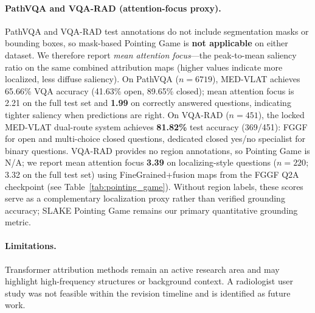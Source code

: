 \paragraph{PathVQA and VQA-RAD (attention-focus proxy).}
PathVQA and VQA-RAD test annotations do not include segmentation masks or
bounding boxes, so mask-based Pointing Game is \textbf{not applicable} on either
dataset.
We therefore report \emph{mean attention focus}---the peak-to-mean saliency
ratio on the same combined attribution maps (higher values indicate more
localized, less diffuse saliency).
On PathVQA ($n{=}6719$), MED-VLAT achieves 65.66\% VQA accuracy (41.63\%
open, 89.65\% closed); mean attention focus is 2.21 on the full test set and
\textbf{1.99} on correctly answered questions, indicating tighter saliency when
predictions are right.
On VQA-RAD ($n{=}451$), the locked MED-VLAT dual-route system achieves
\textbf{81.82\%} test accuracy (369/451): FGGF for open and multi-choice
closed questions, dedicated closed yes/no specialist for binary questions.
VQA-RAD provides no region annotations, so Pointing Game is N/A; we report
mean attention focus \textbf{3.39} on localizing-style questions ($n{=}220$;
3.32 on the full test set) using FineGrained+fusion maps from the FGGF Q2A
checkpoint (see Table~\ref{tab:pointing_game}).
Without region labels, these scores serve as a complementary localization proxy
rather than verified grounding accuracy; SLAKE Pointing Game remains our
primary quantitative grounding metric.

\paragraph{Limitations.}
Transformer attribution methods remain an active research area and may
highlight high-frequency structures or background context.
A radiologist user study was not feasible within the revision timeline and is
identified as future work.


